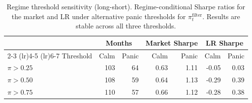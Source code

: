 \begin{table}[H]
\centering
\small
\begin{tabular}{l r r r r r r}
\toprule
 & \multicolumn{2}{c}{Months} & \multicolumn{2}{c}{Market Sharpe} & \multicolumn{2}{c}{LR Sharpe} \\
\cmidrule(lr){2-3} \cmidrule(lr){4-5} \cmidrule(lr){6-7}
Threshold & Calm & Panic & Calm & Panic & Calm & Panic \\
\midrule
$\pi > 0.25$ & 103 & 64 & 0.63 & 1.11 & -0.05 & 0.03 \\
$\pi > 0.50$ & 108 & 59 & 0.64 & 1.13 & -0.29 & 0.39 \\
$\pi > 0.75$ & 110 & 57 & 0.66 & 1.12 & -0.28 & 0.38 \\
\bottomrule
\end{tabular}
\caption{Regime threshold sensitivity (long-short). Regime-conditional Sharpe ratios for the market and LR under alternative panic thresholds for $\pi_t^{\text{filter}}$. Results are stable across all three thresholds.}
\label{tab:threshold_sensitivity}
\end{table}